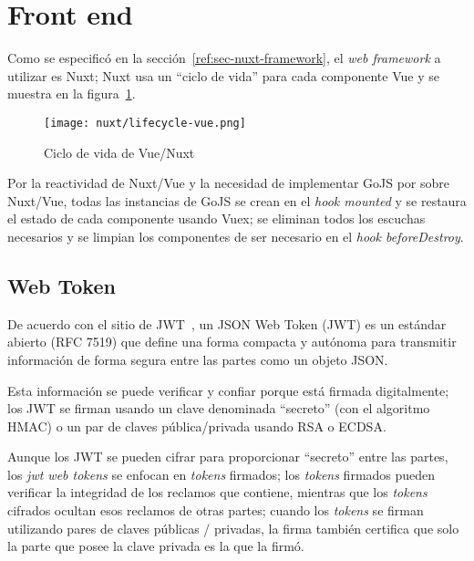 
\section{Front end}


Como se especificó en la sección~\ref{ref:sec-nuxt-framework}, el \textit{web framework} a utilizar es Nuxt; Nuxt usa un  ``ciclo de vida'' para cada componente Vue y se muestra en la figura~\ref{img:nuxt-lifecycle}.


\begin{figure}[H]
    \centering
    \texttt{[image: nuxt/lifecycle-vue.png]}
    \caption{Ciclo de vida de Vue/Nuxt}
    \label{img:nuxt-lifecycle}
  \end{figure}
  
Por la reactividad de Nuxt/Vue y la necesidad de implementar GoJS por sobre Nuxt/Vue, todas las instancias de GoJS se crean en el \textit{hook mounted} y se restaura el estado de cada componente usando Vuex; se eliminan todos los escuchas necesarios y se limpian los componentes de ser necesario en el \textit{hook beforeDestroy}.

\subsection{Web Token}


De acuerdo con el sitio de JWT~\cite{jwt_web_2020}, un JSON Web Token (JWT) es un estándar abierto (RFC 7519) que define una forma compacta y autónoma para transmitir información de forma segura entre las partes como un objeto JSON.


Esta información se puede verificar y confiar porque está firmada digitalmente; los JWT se firman usando un clave denominada ``secreto'' (con el algoritmo HMAC) o un par de claves pública/privada usando RSA o ECDSA.

Aunque los JWT se pueden cifrar para proporcionar ``secreto'' entre las partes, los \textit{jwt web tokens} se enfocan en \textit{tokens} firmados; los \textit{tokens} firmados pueden verificar la integridad de los reclamos que contiene, mientras que los \textit{tokens} cifrados ocultan esos reclamos de otras partes; cuando los \textit{tokens} se firman utilizando pares de claves públicas / privadas, la firma también certifica que solo la parte que posee la clave privada es la que la firmó.


